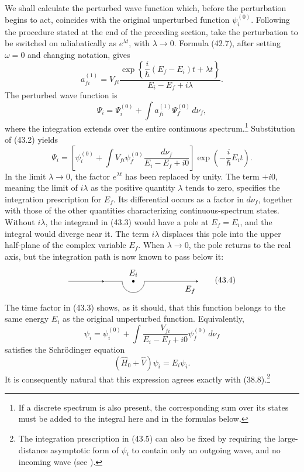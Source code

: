 We shall calculate the perturbed wave function which, before the perturbation
begins to act, coincides with the original unperturbed
function $\psi_i^{(0)}$. Following the procedure stated at the end of the
preceding section, take the perturbation to be switched on adiabatically as
$e^{\lambda t}$, with $\lambda\to0$. Formula (42.7), after setting
$\omega=0$ and changing notation, gives
\begin{equation}
  a_{fi}^{(1)}=V_{fi}
  \frac{\exp\left\{\dfrac{i}{\hbar}(E_f-E_i)t+\lambda t\right\}}
       {E_i-E_f+i\lambda}.
  \tag{43.2}
\end{equation}
The perturbed wave function is
\[
  \Psi_i=\Psi_i^{(0)}+\int a_{fi}^{(1)}\Psi_f^{(0)}\,d\nu_f,
\]
where the integration extends over the entire continuous
spectrum.\footnote{If a discrete spectrum is also present, the corresponding
sum over its states must be added to the integral here and in the formulas
below.} Substitution of (43.2) yields
\begin{equation}
  \Psi_i=\left[\psi_i^{(0)}+\int
  V_{fi}\psi_f^{(0)}\frac{d\nu_f}{E_i-E_f+i0}\right]
  \exp\left(-\frac{i}{\hbar}E_it\right).
  \tag{43.3}
\end{equation}
In the limit $\lambda\to0$, the factor $e^{\lambda t}$ has been replaced by
unity. The term $+i0$, meaning the limit of $i\lambda$ as the positive
quantity $\lambda$ tends to zero, specifies the integration prescription for
$E_f$. Its differential occurs as a factor in $d\nu_f$, together with those
of the other quantities characterizing continuous-spectrum states. Without
$i\lambda$, the integrand in (43.3) would have a pole at $E_f=E_i$, and the
integral would diverge near it. The term $i\lambda$ displaces this pole into
the upper half-plane of the complex variable $E_f$. When $\lambda\to0$, the
pole returns to the real axis, but the integration path is now known to pass
below it:
\begin{equation}
\begin{tikzpicture}[x=1cm,y=1cm,>=stealth,baseline=-0.35ex]
  \draw[->] (-2.8,0) -- (-1.25,0);
  \draw (-1.25,0) -- (-0.48,0)
        arc[start angle=180,end angle=360,radius=0.48]
        -- (1.25,0);
  \draw[->] (1.25,0) -- (2.8,0);
  \fill (0,0) circle (1.5pt);
  \node[above=2pt] at (0,0) {$E_i$};
  \node[below=2pt] at (2.45,0) {$E_f$};
\end{tikzpicture}
  \tag{43.4}
\end{equation}
The time factor in (43.3) shows, as it should, that this function belongs to
the same energy $E_i$ as the original unperturbed function. Equivalently,
\begin{equation}
  \psi_i=\psi_i^{(0)}+\int
  \frac{V_{fi}}{E_i-E_f+i0}\psi_f^{(0)}\,d\nu_f
  \tag{43.5}
\end{equation}
satisfies the Schrödinger equation
\[
  (\hat H_0+\hat V)\psi_i=E_i\psi_i.
\]
It is consequently natural that this expression agrees exactly with (38.8).\footnote{The integration prescription in (43.5) can also be fixed by
requiring the large-distance asymptotic form of $\psi_i$ to contain only an
outgoing wave, and no incoming wave (see ).}

